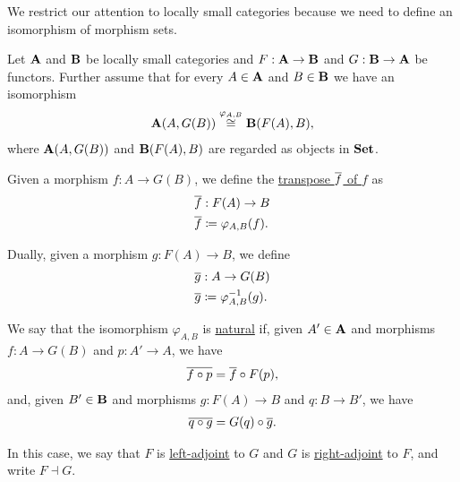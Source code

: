 \begin{note}
  We restrict our attention to locally small categories because we need to define an isomorphism of morphism sets.
\end{note}
\begin{definition}\label{def:adjoint_functor}\cite[definition 2.1.1]{Leinster2014}
  Let $\operatorname{\mathbf{A}}$ and $\operatorname{\mathbf{B}}$ be locally small categories and $F: \operatorname{\mathbf{A}} \to \operatorname{\mathbf{B}}$ and $G: \operatorname{\mathbf{B}} \to \operatorname{\mathbf{A}}$ be functors. Further assume that for every $A \in \operatorname{\mathbf{A}}$ and $B \in \operatorname{\mathbf{B}}$ we have an isomorphism
  \begin{align*}
    \operatorname{\mathbf{A}}(A, G(B)) \overset {\varphi_{A, B}} {\cong} \operatorname{\mathbf{B}}(F(A), B),
  \end{align*}
  where $\operatorname{\mathbf{A}}(A, G(B))$ and $\operatorname{\mathbf{B}}(F(A), B)$ are regarded as objects in $\operatorname{\mathbf{Set}}$.

  Given a morphism $f: A \to G(B)$, we define the \ul{transpose $\overline{f}$ of $f$} as
  \begin{align*}
    &\overline{f}: F(A) \to B \\
    &\overline{f} \coloneqq \varphi_{A, B} (f).
  \end{align*}

  Dually, given a morphism $g: F(A) \to B$, we define
  \begin{align*}
    &\overline{g}: A \to G(B) \\
    &\overline{g} \coloneqq \varphi_{A, B}^{-1} (g).
  \end{align*}

  We say that the isomorphism $\varphi_{A, B}$ is \ul{natural} if,  given $A' \in \operatorname{\mathbf{A}}$ and morphisms $f: A \to G(B)$ and $p: A' \to A$, we have
  \begin{align*}
    \overline{f \circ p} = \overline{f} \circ F(p),
  \end{align*}
  and, given $B' \in \operatorname{\mathbf{B}}$ and morphisms $g: F(A) \to B$ and $q: B \to B'$, we have
  \begin{align*}
    \overline{q \circ g} = G(q) \circ \overline{g}.
  \end{align*}

  In this case, we say that $F$ is \ul{left-adjoint} to $G$ and $G$ is \ul{right-adjoint} to $F$, and write $F \dashv G$.
\end{definition}

